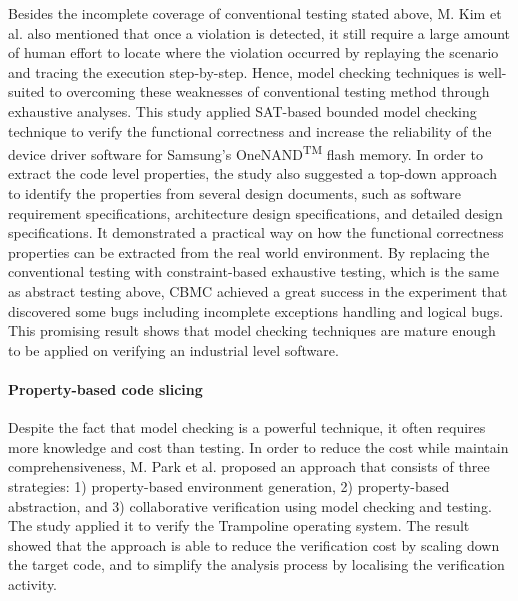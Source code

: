 Besides the incomplete coverage of conventional testing stated above, M. Kim et al. \cite{4639323, Kim:2008:FVF:1429078.1429092, 5510242} also mentioned that once a violation is detected, it still require a large amount of human effort to locate where the violation occurred by replaying the scenario and tracing the execution step-by-step. Hence, model checking techniques is well-suited to overcoming these weaknesses of conventional testing method through exhaustive analyses. This study applied SAT-based bounded model checking technique to verify the functional correctness and increase the reliability of the device driver software for Samsung's OneNAND\textsuperscript{TM} flash memory. In order to extract the code level properties, the study also suggested a top-down approach to identify the properties from several design documents, such as software requirement specifications, architecture design specifications, and detailed design specifications. It demonstrated a practical way on how the functional correctness properties can be extracted from the real world environment. By replacing the conventional testing with constraint-based exhaustive testing, which is the same as abstract testing above, CBMC achieved a great success in the experiment that discovered some bugs including incomplete exceptions handling and logical bugs. This promising result shows that model checking techniques are mature enough to be applied on verifying an industrial level software.


\paragraph{Property-based code slicing}
Despite the fact that model checking is a powerful technique, it often requires more knowledge and cost than testing. In order to reduce the cost while maintain comprehensiveness, M. Park et al. \cite{DBLP:journals/corr/abs-1301-0042} proposed an approach that consists of three strategies: 1) property-based environment generation, 2) property-based abstraction, and 3) collaborative verification using model checking and testing. The study applied it to verify the Trampoline operating system. The result showed that the approach is able to reduce the verification cost by scaling down the target code, and to simplify the analysis process by localising the verification activity.

